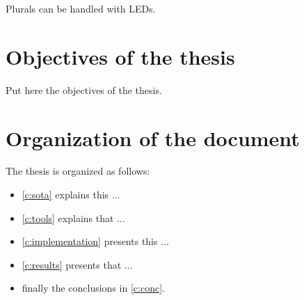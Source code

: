 Plurals can be handled with \acp{LED}.

\section{Objectives of the thesis}

%
%
Put here the objectives of the thesis.

\section{Organization of the document}

The thesis is organized as follows:

%
%
\begin{itemize}
\item \cref{c:sota} explains this $\ldots$
\item \cref{c:tools} explains that $\ldots$
\item \cref{c:implementation} presents this $\ldots$
\item \cref{c:results} presents that $\ldots$
\item finally the conclusions in \cref{c:conc}.
\end{itemize}